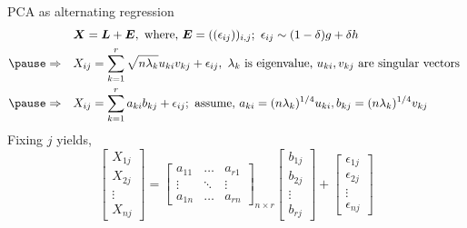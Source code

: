 \documentclass[10pt]{beamer}
\newcommand{\bb}[1]{\boldsymbol{#1}}
\begin{document}
\begin{frame}{PCA as alternating regression}
    \begin{align*}
     & \bb{X} = \bb{L} + \bb{E}, \text{ where, } \bb{E} = ((\epsilon_{ij}))_{i,j}; \ \epsilon_{ij} \sim (1-\delta) g + \delta h\\
    \pause
    \Rightarrow \quad 
        & X_{ij} = \sum_{k=1}^{r} \sqrt{n\lambda_k} u_{ki} v_{kj} + \epsilon_{ij}, \ \lambda_k \text{ is eigenvalue, } u_{ki}, v_{kj} \text{ are singular vectors } \\
    \pause 
    \Rightarrow \quad 
        & X_{ij} = \sum_{k=1}^{r} a_{ki} b_{kj} + \epsilon_{ij};
        \ \text{assume, } a_{ki} = (n\lambda_k)^{1/4} u_{ki}, b_{kj} = (n\lambda_k)^{1/4} v_{kj}\\
    \end{align*}
    \pause
    Fixing $j$ yields, 
    \begin{equation*}
        \begin{bmatrix}
            X_{1j}\\
            X_{2j}\\
            \vdots\\
            X_{nj}
        \end{bmatrix} = 
        \begin{bmatrix}
            a_{11} & \dots & a_{r1}\\
            \vdots & \ddots & \vdots\\
            a_{1n} & \dots & a_{rn}
        \end{bmatrix}_{n \times r}
        \begin{bmatrix}
            b_{1j}\\
            b_{2j}\\
            \vdots\\
            b_{rj}
        \end{bmatrix} + 
        \begin{bmatrix}
            \epsilon_{1j}\\
            \epsilon_{2j}\\
            \vdots \\
            \epsilon_{nj}
        \end{bmatrix}
    \end{equation*}
\end{frame}
\end{document}
